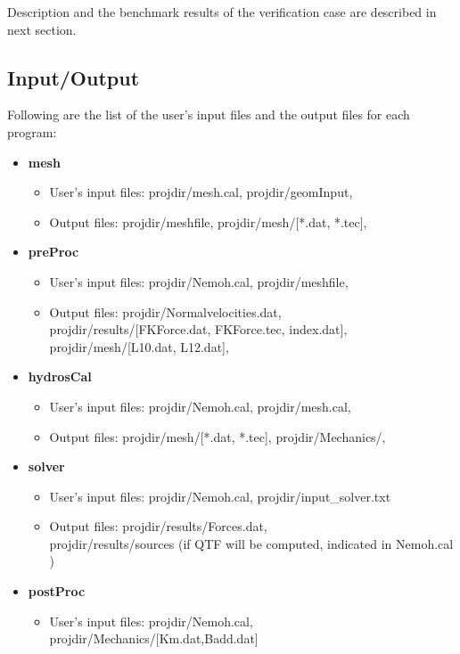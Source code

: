 \documentclass[12pt,a4paper,titlepage]{article}
\begin{document}
Description and the benchmark results of the verification case are described in next section.

\subsection{Input/Output}
Following are the list of the user's input files and the output files for each program:
\begin{itemize}
\item \textbf{mesh}
\begin{itemize}
\item User's input files: projdir/mesh.cal, projdir/geomInput,
\item Output files: projdir/meshfile, projdir/mesh/[*.dat, *.tec],
\end{itemize}
\item \textbf{preProc}
\begin{itemize}
\item User's input files: projdir/Nemoh.cal, projdir/meshfile,
\item Output files: projdir/Normalvelocities.dat, \\
  \hspace{2cm} projdir/results/[FKForce.dat, FKForce.tec, index.dat], \\
  \hspace{2cm} projdir/mesh/[L10.dat, L12.dat],
\end{itemize}
\item \textbf{hydrosCal}
\begin{itemize}
\item User's input files: projdir/Nemoh.cal, projdir/mesh.cal,
\item Output files: projdir/mesh/[*.dat, *.tec], projdir/Mechanics/,
\end{itemize}
\item \textbf{solver}
\begin{itemize}
\item User's input files: projdir/Nemoh.cal, projdir/input\_solver.txt
\item Output files: projdir/results/Forces.dat,\\
projdir/results/sources (if QTF will be computed, indicated in Nemoh.cal )
\end{itemize}
\item \textbf{postProc}
\begin{itemize}
\item User's input files: projdir/Nemoh.cal, projdir/Mechanics/[Km.dat,Badd.dat]

\end{itemize}
\end{itemize}
\end{document}
